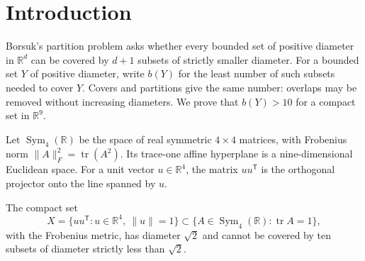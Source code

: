 \section{Introduction}
\label{sec:introduction}

Borsuk's partition problem asks whether every bounded set of positive
diameter in $\mathbb R^d$ can be covered by $d+1$ subsets of strictly
smaller diameter. For a bounded set $Y$ of positive diameter, write $b(Y)$ for the least
number of such subsets needed to cover $Y$. Covers and partitions give
the same number: overlaps may be removed without increasing diameters.
We prove that $b(Y)>10$ for a compact set in $\mathbb R^9$.

Let $\operatorname{Sym}_4(\mathbb R)$ be the space of real symmetric
$4\times4$ matrices, with Frobenius norm
$\|A\|_F^2=\operatorname{tr}(A^2)$. Its trace-one affine hyperplane is
a nine-dimensional Euclidean space. For a unit vector $u\in\mathbb R^4$,
the matrix $uu^{\mathsf T}$ is the orthogonal projector onto the line
spanned by $u$.

\begin{theorem}\label{thm:main}
The compact set
\[
 X=\{uu^{\mathsf T}:u\in\mathbb R^4,\ \|u\|=1\}
 \subset\{A\in\operatorname{Sym}_4(\mathbb R):\operatorname{tr}A=1\},
\]
with the Frobenius metric, has diameter $\sqrt2$ and cannot be covered
by ten subsets of diameter strictly less than $\sqrt2$.
\end{theorem}
